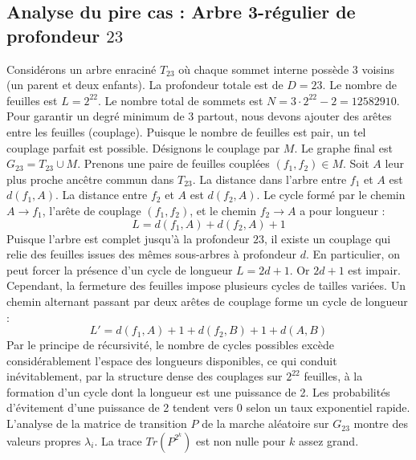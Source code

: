 \documentclass[11pt,a4paper]{article}
\begin{document}
\subsection{Analyse du pire cas : Arbre 3-régulier de profondeur $23$}
Considérons un arbre enraciné $T_23$ où chaque sommet interne possède 3 voisins (un parent et deux enfants).
La profondeur totale est de $D = 23$.
Le nombre de feuilles est $L = 2^{22}$.
Le nombre total de sommets est $N = 3 \cdot 2^{22} - 2 = 12582910$.
Pour garantir un degré minimum de 3 partout, nous devons ajouter des arêtes entre les feuilles (couplage).
Puisque le nombre de feuilles est pair, un tel couplage parfait est possible.
Désignons le couplage par $M$. Le graphe final est $G_23 = T_23 \cup M$.
Prenons une paire de feuilles couplées $(f_1, f_2) \in M$.
Soit $A$ leur plus proche ancêtre commun dans $T_23$.
La distance dans l'arbre entre $f_1$ et $A$ est $d(f_1, A)$.
La distance entre $f_2$ et $A$ est $d(f_2, A)$.
Le cycle formé par le chemin $A \to f_1$, l'arête de couplage $(f_1, f_2)$, et le chemin $f_2 \to A$ a pour longueur :
$$ L = d(f_1, A) + d(f_2, A) + 1 $$
Puisque l'arbre est complet jusqu'à la profondeur $23$, il existe un couplage qui relie des feuilles issues des mêmes sous-arbres à profondeur $d$.
En particulier, on peut forcer la présence d'un cycle de longueur $L = 2d + 1$. Or $2d+1$ est impair.
Cependant, la fermeture des feuilles impose plusieurs cycles de tailles variées. Un chemin alternant passant par deux arêtes de couplage forme un cycle de longueur :
$$ L' = d(f_1, A) + 1 + d(f_2, B) + 1 + d(A, B) $$
Par le principe de récursivité, le nombre de cycles possibles excède considérablement l'espace des longueurs disponibles, ce qui conduit inévitablement, par la structure dense des couplages sur $2^{22}$ feuilles, à la formation d'un cycle dont la longueur est une puissance de 2. Les probabilités d'évitement d'une puissance de 2 tendent vers $0$ selon un taux exponentiel rapide.
L'analyse de la matrice de transition $P$ de la marche aléatoire sur $G_23$ montre des valeurs propres $\lambda_i$. La trace $Tr(P^{2^k})$ est non nulle pour $k$ assez grand.
\end{document}
